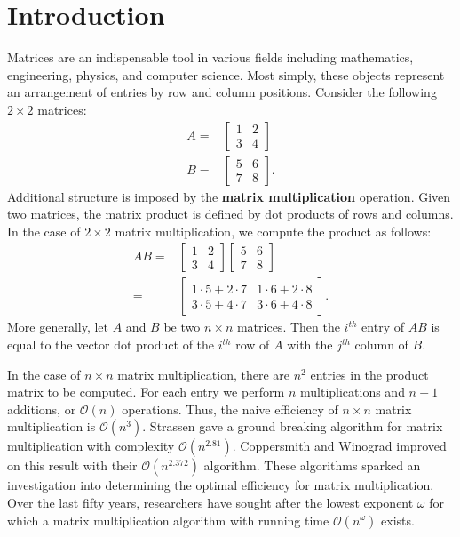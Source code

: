 \documentclass[../thesis.tex]{subfiles}
\begin{document}
\section{Introduction}\label{sec:Introduction}
Matrices are an indispensable tool in various fields including mathematics, engineering, physics, and computer science. Most simply, these objects represent an arrangement of entries by row and column positions. Consider the following $2\times 2$ matrices:
\begin{align*}
    A =& \begin{bmatrix}1&2\\3&4\end{bmatrix}\\
    B =& \begin{bmatrix}5&6\\7&8\end{bmatrix}.
\end{align*}
Additional structure is imposed by the \textbf{matrix multiplication} operation. Given two matrices, the matrix product is defined by dot products of rows and columns. In the case of $2\times 2$ matrix multiplication, we compute the product as follows:
\begin{align*}
    AB =& \begin{bmatrix}1&2\\3&4\end{bmatrix}
            \begin{bmatrix}5&6\\7&8\end{bmatrix}\\
        =& \begin{bmatrix}1\cdot5+2\cdot7 & 1\cdot6+2\cdot8\\
                        3\cdot5+4\cdot7 & 3\cdot6+4\cdot8
        \end{bmatrix}.
\end{align*}
More generally, let $A$ and $B$ be two $n\times n$ matrices. Then the $i^{th}$ entry of $AB$ is equal to the vector dot product of the $i^{th}$ row of $A$ with the $j^{th}$ column of $B$.

In the case of $n\times n$ matrix multiplication, there are $n^2$ entries in the product matrix to be computed. For each entry we perform $n$ multiplications and $n-1$ additions, or $\mathcal{O}(n)$ operations. Thus, the naive efficiency of $n\times n$ matrix multiplication is $\mathcal{O}(n^3).$ Strassen \cite{strass} gave a ground breaking algorithm for matrix multiplication with complexity $\mathcal{O}(n^{2.81})$. Coppersmith and Winograd \cite{CandW} improved on this result with their $\mathcal{O}(n^{2.372})$ algorithm. These algorithms sparked an investigation into determining the optimal efficiency for matrix multiplication. Over the last fifty years, researchers have sought after the lowest exponent $\omega$ for which a matrix multiplication algorithm with running time $\mathcal{O}(n^{\omega})$ exists.
\end{document}
